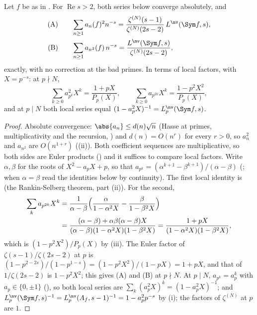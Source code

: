\begin{proposition}\label{prop:lfunctions:rankin-series}
Let $f$ be as in . For $\operatorname{Re}s>2$, both series below converge absolutely, and
\begin{align*}
\text{(A)}&\qquad\sum_{n\ge1}a_n(f)^2n^{-s}=\frac{\zeta^{(N)}(s-1)}{\zeta^{(N)}(2s-2)}\,L^{\nv}(\Sym f,s),\\
\text{(B)}&\qquad\sum_{n\ge1}a_{n^2}(f)\,n^{-s}=\frac{L^{\nv}(\Sym f,s)}{\zeta^{(N)}(2s-2)},
\end{align*}
exactly, with no correction at the bad primes. In terms of local factors, with $X=p^{-s}$: at $p\nmid N$,
\[
\sum_{k\ge0}a_{p^k}^2X^k=\frac{1+pX}{P_p(X)},\qquad\sum_{k\ge0}a_{p^{2k}}X^k=\frac{1-p^2X^2}{P_p(X)},
\]
and at $p\mid N$ both local series equal $(1-a_p^2X)^{-1}=L_p^{\nv}(\Sym f,s)$.
\end{proposition}

\begin{proof}
Absolute convergence: $\abs{a_n}\le d(n)\sqrt n$ (Hasse at primes, multiplicativity and the recursion, ) and $d(n)=O(n^r)$ for every $r>0$, so
$a_n^2$ and $a_{n^2}$ are $O(n^{1+r})$ ((ii)). Both coefficient sequences are multiplicative, so both sides are Euler products
() and it suffices to compare local factors. Write $\alpha,\beta$ for the roots of $X^2-a_pX+p$, so that
$a_{p^k}=(\alpha^{k+1}-\beta^{k+1})/(\alpha-\beta)$ (; when $\alpha=\beta$ read the identities below by continuity). The first local identity is  (the
Rankin-Selberg theorem, part (ii)). For the second,
\begin{align*}
\sum_ka_{p^{2k}}X^k&=\frac1{\alpha-\beta}\Bigl(\frac\alpha{1-\alpha^2X}-\frac\beta{1-\beta^2X}\Bigr)\\
&=\frac{(\alpha-\beta)+\alpha\beta(\alpha-\beta)X}{(\alpha-\beta)(1-\alpha^2X)(1-\beta^2X)}=\frac{1+pX}{(1-\alpha^2X)(1-\beta^2X)},
\end{align*}
which is $(1-p^2X^2)/P_p(X)$ by (iii). The Euler factor of $\zeta(s-1)/\zeta(2s-2)$ at $p$ is $(1-p^{2-2s})/(1-p^{1-s})=(1-p^2X^2)/(1-pX)=1+pX$, and that of
$1/\zeta(2s-2)$ is $1-p^2X^2$; this gives (A) and (B) at $p\nmid N$. At $p\mid N$, $a_{p^k}=a_p^k$ with $a_p\in\{0,\pm1\}$ (), so both local series are
$\sum_k(a_p^2X)^k=(1-a_p^2X)^{-1}$; and $L_p^{\nv}(\Sym f,s)^{-1}=L_p^{\nv}(A_f,s-1)^{-1}=1-a_p^2p^{-s}$ by (i); the factors of $\zeta^{(N)}$ at $p$ are $1$.
\end{proof}

